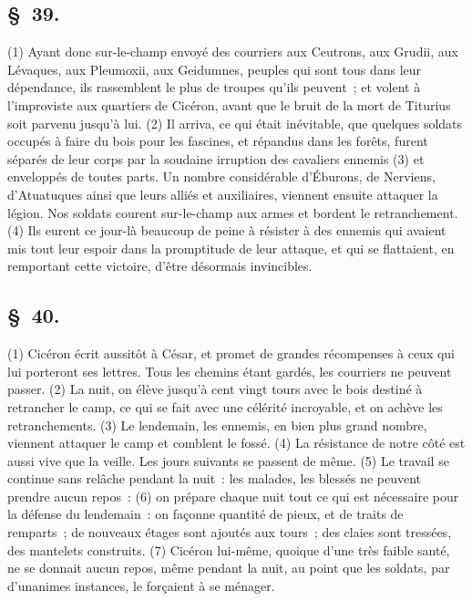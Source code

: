 \documentclass[french,twoside]{book} %
\begin{document}
\subsection[{§ 39.}]{ \textsc{§ 39.} }
\noindent (1) Ayant donc sur-le-champ envoyé des courriers aux Ceutrons, aux Grudii, aux Lévaques, aux Pleumoxii, aux Geidumnes, peuples qui sont tous dans leur dépendance, ils rassemblent le plus de troupes qu’ils peuvent ; et volent à l’improviste aux quartiers de Cicéron, avant que le bruit de la mort de Titurius soit parvenu jusqu’à lui. (2) Il arriva, ce qui était inévitable, que quelques soldats occupés à faire du bois pour les fascines, et répandus dans les forêts, furent séparés de leur corps par la soudaine irruption des cavaliers ennemis (3) et enveloppés de toutes parts. Un nombre considérable d’Éburons, de Nerviens, d’Atuatuques ainsi que leurs alliés et auxiliaires, viennent ensuite attaquer la légion. Nos soldats courent sur-le-champ aux armes et bordent le retranchement. (4) Ils eurent ce jour-là beaucoup de peine à résister à des ennemis qui avaient mis tout leur espoir dans la promptitude de leur attaque, et qui se flattaient, en remportant cette victoire, d’être désormais invincibles.
\subsection[{§ 40.}]{ \textsc{§ 40.} }
\noindent (1) Cicéron écrit aussitôt à César, et promet de grandes récompenses à ceux qui lui porteront ses lettres. Tous les chemins étant gardés, les courriers ne peuvent passer. (2) La nuit, on élève jusqu’à cent vingt tours avec le bois destiné à retrancher le camp, ce qui se fait avec une célérité incroyable, et on achève les retranchements. (3) Le lendemain, les ennemis, en bien plus grand nombre, viennent attaquer le camp et comblent le fossé. (4) La résistance de notre côté est aussi vive que la veille. Les jours suivants se passent de même. (5) Le travail se continue sans relâche pendant la nuit : les malades, les blessés ne peuvent prendre aucun repos : (6) on prépare chaque nuit tout ce qui est nécessaire pour la défense du lendemain : on façonne quantité de pieux, et de traits de remparts ; de nouveaux étages sont ajoutés aux tours ; des claies sont tressées, des mantelets construits. (7) Cicéron lui-même, quoique d’une très faible santé, ne se donnait aucun repos, même pendant la nuit, au point que les soldats, par d’unanimes instances, le forçaient à se ménager.
\end{document}
